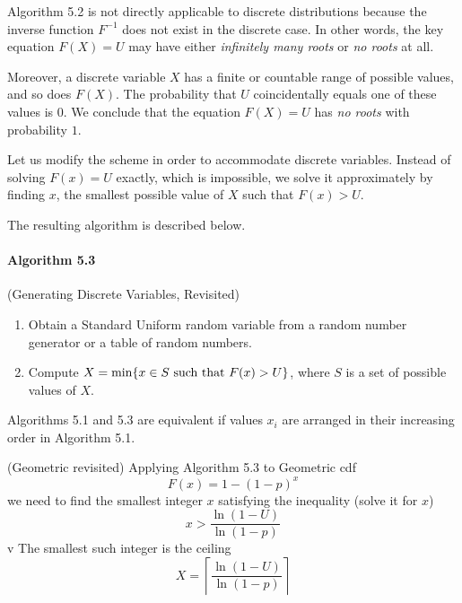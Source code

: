 \begin{multicols}{2}
Algorithm 5.2 is not directly applicable to discrete distributions because the inverse function $F^{-1}$ does not exist in the discrete case. In other words, the key equation $F(X) = U$ may have either \textit{infinitely many roots} or \textit{no roots} at all.

Moreover, a discrete variable $X$ has a finite or countable range of possible values, and so does $F(X)$. The probability that $U$ coincidentally equals one of these values is $0$. We conclude that the equation $F(X) = U$ has \textit{no roots} with probability $1$.

Let us modify the scheme in order to accommodate discrete variables. Instead of solving $F(x) = U$ exactly, which is impossible, we solve it approximately by finding $x$, the smallest possible value of $X$ such that $F(x) > U$.

The resulting algorithm is described below.

\vspace*{\fill}
\columnbreak

\paragraph{Algorithm 5.3} (Generating Discrete Variables, Revisited)
\begin{enumerate}
  \item Obtain a Standard Uniform random variable from a random number generator or a table of random numbers.
  \item Compute $X = \min \{ x \in S \textnormal{ such that } F(x) > U \}$, where $S$ is a set of possible values of $X$.  
\end{enumerate}
Algorithms 5.1 and 5.3 are equivalent if values $x_i$ are arranged in their increasing order in Algorithm 5.1.

\begin{example}{ (Geometric revisited)}
  Applying Algorithm 5.3 to Geometric cdf
  \begin{equation*}
    F(x) = 1 - (1 - p)^x
  \end{equation*}
  we need to find the smallest integer $x$ satisfying the inequality (solve it for $x$)
  \begin{equation*}
    x > \frac{\ln(1 - U)}{\ln(1 - p)}
  \end{equation*}v
  The smallest such integer is the ceiling
  \begin{equation}
    X = \left\lceil \frac{\ln(1 - U)}{\ln(1 - p)} \right\rceil
  \end{equation}
\end{example}


\end{multicols}
